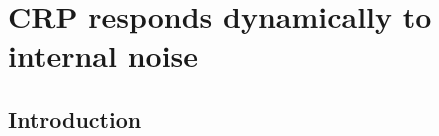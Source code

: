 





% 
%
% 



\chapter{CRP responds dynamically to internal noise}
\label{chapter:CRP}

%
%
%

\section{Introduction}




